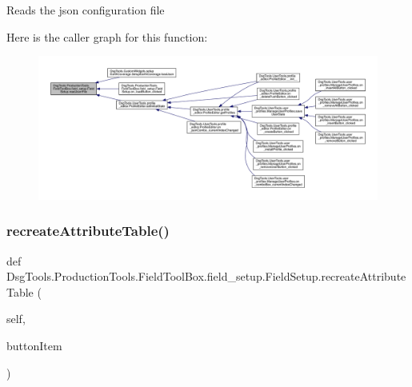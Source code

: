 \begin{DoxyVerb}Reads the json configuration file
\end{DoxyVerb}
 Here is the caller graph for this function\+:
\nopagebreak
\begin{figure}[H]
\begin{center}
\leavevmode
\includegraphics[width=350pt]{class_dsg_tools_1_1_production_tools_1_1_field_tool_box_1_1field__setup_1_1_field_setup_aac4a1f946a786021c21263aaf7d7466e_icgraph}
\end{center}
\end{figure}
\mbox{\label{class_dsg_tools_1_1_production_tools_1_1_field_tool_box_1_1field__setup_1_1_field_setup_a5e7e4796f0eff36255c4d66ccc268b8d}} 
\subsubsection{\texorpdfstring{recreate\+Attribute\+Table()}{recreateAttributeTable()}}
{\footnotesize\ttfamily def Dsg\+Tools.\+Production\+Tools.\+Field\+Tool\+Box.\+field\+\_\+setup.\+Field\+Setup.\+recreate\+Attribute\+Table (\begin{DoxyParamCaption}\item[{}]{self,  }\item[{}]{button\+Item }\end{DoxyParamCaption})}


